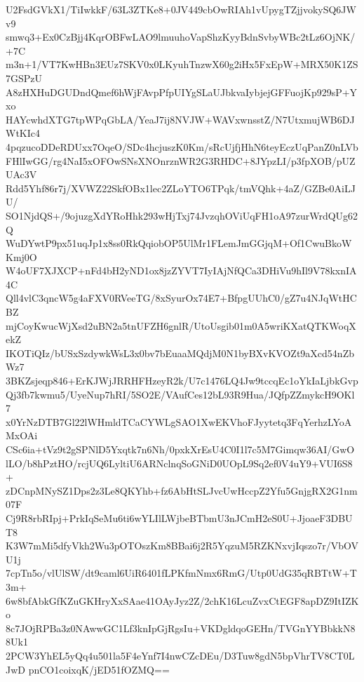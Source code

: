 U2FsdGVkX1/TiIwkkF/63L3ZTKe8+0JV449cbOwRIAh1vUpygTZjjvokySQ6JWv9
smwq3+Ex0CzBjj4KqrOBFwLAO9lmuuhoVapShzKyyBdnSvbyWBc2tLz6OjNK/+7C
m3n+1/VT7KwHBn3EUz7SKV0x0LKyuhTnzwX60g2iHx5FxEpW+MRX50K1ZS7GSPzU
A8zHXHuDGUDndQmef6hWjFAvpPfpUIYgSLaUJbkvaIybjejGFFuojKp929sP+Yxo
HAYcwhdXTG7tpWPqGbLA/YeaJ7ij8NVJW+WAVxwnsstZ/N7UtxmujWB6DJWtKIc4
4pqzucoDDeRDUxx7OqeO/SDc4hcjuszK0Km/sRcUjfjHhN6teyEczUqPanZ0nLVb
FHlIwGG/rg4NaI5xOFOwSNsXNOnrznWR2G3RHDC+8JYpzLI/p3fpXOB/pUZUAc3V
Rdd5Yhf86r7j/XVWZ22SkfOBx1lec2ZLoYTO6TPqk/tmVQhk+4aZ/GZBe0AiLJU/
SO1NjdQS+/9ojuzgXdYRoHhk293wHjTxj74JvzqhOViUqFH1oA97zurWrdQUg62Q
WuDYwtP9px51uqJp1x8ss0RkQqiobOP5UlMr1FLemJmGGjqM+Of1CwuBkoWKmj0O
W4oUF7XJXCP+nFd4bH2yND1ox8jzZYVT7IyIAjNfQCa3DHiVu9hIl9V78kxnIA4C
Qll4vlC3qncW5g4aFXV0RVeeTG/8xSyurOx74E7+BfpgUUhC0/gZ7u4NJqWtHCBZ
mjCoyKwucWjXsd2uBN2a5tnUFZH6gnlR/UtoUsgib01m0A5wriKXatQTKWoqXekZ
IKOTiQIz/bUSxSzdywkWsL3x0bv7bEuaaMQdjM0N1byBXvKVOZt9aXcd54nZbWz7
3BKZsjeqp846+ErKJWjJRRHFHzeyR2k/U7c1476LQ4Jw9tccqEc1oYkIaLjbkGvp
Qj3fb7kwmu5/UyeNup7hRI/5SO2E/VAufCes12bL93R9Hua/JQfpZZmykcH9OKl7
x0YrNzDTB7Gl22lWHmldTCaCYWLgSAO1XwEKVhoFJyytetq3FqYerhzLYoAMxOAi
CSc6ia+tVz9t2gSPNlD5Yxqtk7n6Nh/0pxkXrEsU4C0I1l7c5M7Gimqw36AI/GwO
lLO/b8hPztHO/rcjUQ6LyltiU6ARNclnqSoGNiD0UOpL9Sq2ef0V4uY9+VUI6S8+
zDCnpMNySZ1Dps2z3Le8QKYhb+fz6AbHtSLJvcUwHccpZ2Yfu5GnjgRX2G1nm07F
Cj9R8rbRIpj+PrkIqSeMu6ti6wYLIlLWjbeBTbmU3nJCmH2eS0U+JjoaeF3DBUT8
K3W7mMi5dfyVkh2Wu3pOTOszKm8BBai6j2R5YqzuM5RZKNxvjIqszo7r/VbOVU1j
7cpTn5o/vlUlSW/dt9caml6UiR6401fLPKfmNmx6RmG/Utp0UdG35qRBTtW+T3m+
6w8bfAbkGfKZuGKHryXxSAae41OAyJyz2Z/2chK16LcuZvxCtEGF8apDZ9ItIZKo
8c7JOjRPBa3z0NAwwGC1Lf3knIpGjRgsIu+VKDgldqoGEHn/TVGnYYBbkkN88Uk1
2PCW3YhEL5yQq4u501la5F4eYnf7I4nwCZcDEu/D3Tuw8gdN5bpVhrTV8CT0LJwD
pnCO1coixqK/jED51fOZMQ==
